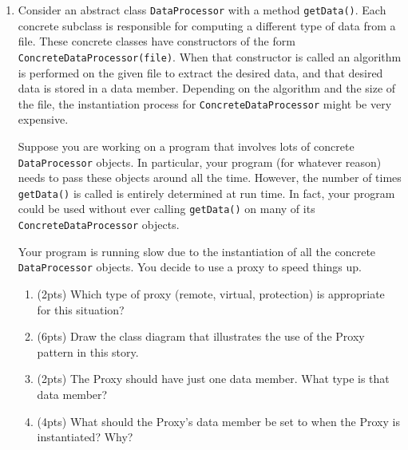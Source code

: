 \documentclass[11pt]{article}
\newlength{\up}\setlength{\up}{-\baselineskip}
\begin{document}
\begin{enumerate}
\begin{enumerate}
    \vfill
    \vfill

  \end{enumerate}

\newpage

  \item Consider an abstract class \texttt{DataProcessor} with a method \texttt{getData()}. Each concrete subclass is responsible for computing a different type of data from a file. These concrete classes have constructors of the form \texttt{ConcreteDataProcessor(file)}. When that constructor is called an algorithm is performed on the given file to extract the desired data, and that desired data is stored in a data member. Depending on the algorithm and the size of the file, the instantiation process for \texttt{ConcreteDataProcessor} might be very expensive. 

  Suppose you are working on a program that involves lots of concrete \texttt{DataProcessor} objects. In particular, your program (for whatever reason) needs to pass these objects around all the time. However, the number of times \texttt{getData()} is called is entirely determined at run time. In fact, your program could be used without ever calling \texttt{getData()} on many of its \texttt{ConcreteDataProcessor} objects. 

  Your program is running slow due to the instantiation of all the concrete \texttt{DataProcessor} objects. You decide to use a proxy to speed things up.

  \begin{enumerate}

    \item (2pts) Which type of proxy (remote, virtual, protection) is appropriate for this situation?

    \vspace{0.4in}

    \item (6pts) Draw the class diagram that illustrates the use of the Proxy pattern in this story. 

    \vfill
    \vfill
    \vfill
    \vfill
    \vfill
    \vfill

    \item (2pts) The Proxy should have just one data member. What type is that data member?

    \vspace{0.4in}

    \item (4pts) What should the Proxy's data member be set to when the Proxy is instantiated? Why?


\end{enumerate}
\end{enumerate}
\end{document}
